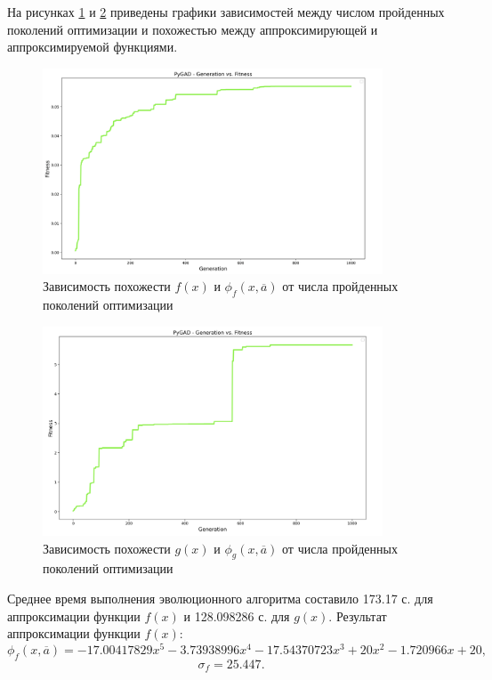 На рисунках \ref{img:fitness_f} и \ref{img:fitness_g} приведены графики зависимостей между числом пройденных поколений оптимизации и похожестью между аппроксимирующей и аппроксимируемой функциями.

\begin{figure}
	\begin{center}
		\includegraphics[width=0.9\textwidth]{images/1.png}
	\end{center}
	\caption{Зависимость похожести $f(x)$ и $\phi_f(x, \overline{a})$ от числа пройденных поколений оптимизации}
	\label{img:fitness_f}
\end{figure}

\begin{figure}
	\begin{center}
		\includegraphics[width=0.9\textwidth]{images/2.png}
	\end{center}
	\caption{Зависимость похожести $g(x)$ и $\phi_g(x, \overline{a})$ от числа пройденных поколений оптимизации}
	\label{img:fitness_g}
\end{figure}

Среднее время выполнения эволюционного алгоритма составило 173.17 с. для аппроксимации функции $f(x)$ и 128.098286 с. для $g(x)$. Результат аппроксимации функции $f(x)$: 
\begin{equation}
	\phi_f(x, \overline{a}) = -17.00417829x^5-3.73938996x^4-17.54370723x^3+20x^2-1.720966x+20,
	\end{equation}
	\begin{equation}
	\sigma_f = 25.447.
\end{equation}

